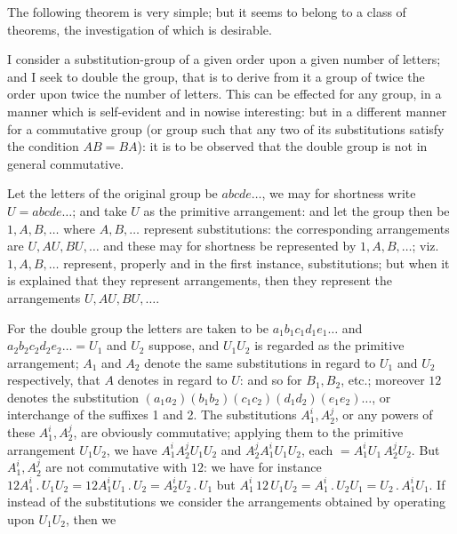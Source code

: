 \documentclass[11pt,a4paper]{article}
\begin{document}
\medskip

\noindent The following theorem is very simple; but it seems to belong to a class of theorems, the investigation of which is desirable.

I consider a substitution-group of a given order upon a given number of letters; and I seek to double the group, that is to derive from it a group of twice the order upon twice the number of letters. This can be effected for any group, in a manner which is self-evident and in nowise interesting: but in a different manner for a commutative group (or group such that any two of its substitutions satisfy the condition $AB = BA$): it is to be observed that the double group is not in general commutative.

Let the letters of the original group be $abcde\ldots$, we may for shortness write $U = abcde\ldots$; and take $U$ as the primitive arrangement: and let the group then be $1, A, B, \ldots$ where $A, B, \ldots$ represent substitutions: the corresponding arrangements are $U, AU, BU, \ldots$ and these may for shortness be represented by $1, A, B, \ldots$; viz.\ $1, A, B, \ldots$ represent, properly and in the first instance, substitutions; but when it is explained that they represent arrangements, then they represent the arrangements $U, AU, BU, \ldots$.

For the double group the letters are taken to be $a_{1}b_{1}c_{1}d_{1}e_{1}\ldots$ and $a_{2}b_{2}c_{2}d_{2}e_{2}\ldots = U_{1}$ and $U_{2}$ suppose, and $U_{1}U_{2}$ is regarded as the primitive arrangement; $A_{1}$ and $A_{2}$ denote the same substitutions in regard to $U_{1}$ and $U_{2}$ respectively, that $A$ denotes in regard to $U$: and so for $B_{1}, B_{2}$, etc.; moreover $12$ denotes the substitution $(a_{1}a_{2})(b_{1}b_{2})(c_{1}c_{2})(d_{1}d_{2})(e_{1}e_{2})\ldots$, or interchange of the suffixes 1 and 2. The substitutions $A_{1}^{i}, A_{2}^{j}$, or any powers of these $A_{1}^{i}, A_{2}^{j}$, are obviously commutative; applying them to the primitive arrangement $U_{1}U_{2}$, we have $A_{1}^{i}A_{2}^{j}U_{1}U_{2}$ and $A_{2}^{j}A_{1}^{i}U_{1}U_{2}$, each $= A_{1}^{i}U_{1}\,A_{2}^{j}U_{2}$. But $A_{1}^{i}, A_{2}^{j}$ are not commutative with $12$: we have for instance $12A_{1}^{i}\,.\,U_{1}U_{2} = 12A_{1}^{i}U_{1}\,.\,U_{2} = A_{2}^{i}U_{2}\,.\,U_{1}$ but $A_{1}^{i}\,12\,U_{1}U_{2} = A_{1}^{i}\,.\,U_{2}U_{1} = U_{2}\,.\,A_{1}^{i}U_{1}$. If instead of the substitutions we consider the arrangements obtained by operating upon $U_{1}U_{2}$, then we

\newpage
\end{document}
